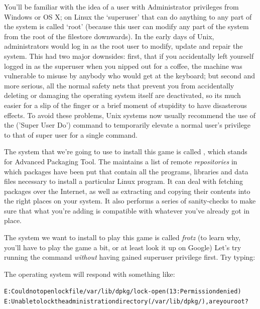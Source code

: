 You'll be familiar with the idea of a user with Administrator privileges from Windows or OS X; on Linux the `superuser' that can do anything to any part of the system is called `root' (because this user can modify any part of the system from the root of the filestore downwards). In the early days of Unix, administrators would log in as the root user to modify, update and repair the system. This had two major downsides: first, that if you accidentally left yourself logged in as the superuser when you nipped out for a coffee, the machine was vulnerable to misuse by anybody who would get at the keyboard; but second and more serious, all the normal safety nets that prevent you from accidentally deleting or damaging the operating system itself are deactivated, so its much easier for a slip of the finger or a brief moment of stupidity to have disasterous effects. To avoid these problems, Unix systems now usually recommend the use of the  ('Super User Do') command to temporarily elevate a normal user's privilege to that of super user for a single command. 

The system that we're going to use to install this game is called , which stands for Advanced Packaging Tool. The  maintains a list of remote \textit{repositories} in which packages have been put that contain all the programs, libraries and data files necessary to install a particular Linux program. It can deal with fetching packages over the Internet, as well as extracting and copying their contents into the right places on your system. It also performs a series of sanity-checks to make sure that what you're adding is compatible with whatever you've already got in place.

The system we want to install to play this game is called \textit{frotz} (to learn why, you'll have to play the game a bit, or at least look it up on Google) Let's try running the  command \textit{without} having gained superuser privilege first. Try typing:


\noindent The operating system will respond with something like:

\begin{alltt}
  \small
E: Could not open lock file /var/lib/dpkg/lock - open (13: Permission denied)
E: Unable to lock the administration directory (/var/lib/dpkg/), are you root?
\end{alltt}

